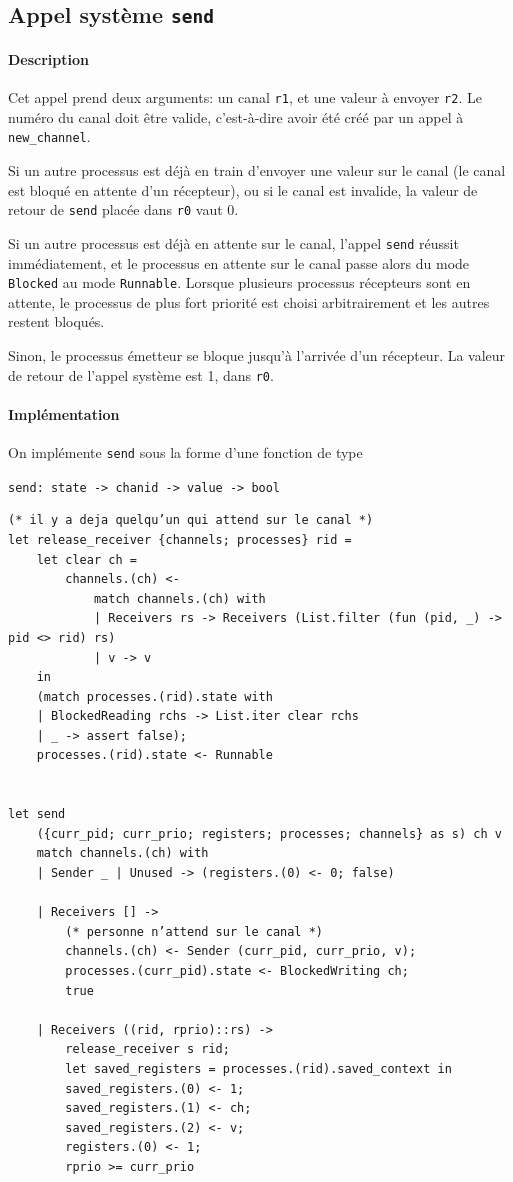\documentclass[french, toc]{../cs-classes/cs-classes}
\begin{document}
\subsection{Appel système \texttt{send}}
\paragraph*{Description} 
Cet appel prend deux arguments: un canal \texttt{r1}, et une valeur à envoyer \texttt{r2}. Le numéro du canal doit être valide, c'est-à-dire avoir été créé par un appel à \texttt{new\_channel}. 

Si un autre processus est déjà en train d'envoyer une valeur sur le canal (le canal est bloqué en attente d'un récepteur), ou si le canal est invalide, la valeur de retour de \texttt{send} placée dans \texttt{r0} vaut 0. 

Si un autre processus est déjà en attente sur le canal, l'appel \texttt{send} réussit immédiatement, et le processus en attente sur le canal passe alors du mode \texttt{Blocked} au mode \texttt{Runnable}. Lorsque plusieurs processus récepteurs sont en attente, le processus de plus fort priorité est choisi arbitrairement et les autres restent bloqués.

Sinon, le processus émetteur se bloque jusqu'à l'arrivée d'un récepteur. La valeur de retour de l'appel système est 1, dans \texttt{r0}.

\paragraph*{Implémentation} On implémente \texttt{send} sous la forme d'une fonction de type
\begin{center}
    \texttt{send: state -> chanid -> value -> bool}
\end{center}

\begin{verbatim}
(* il y a deja quelqu’un qui attend sur le canal *)
let release_receiver {channels; processes} rid =
    let clear ch =
        channels.(ch) <-
            match channels.(ch) with
            | Receivers rs -> Receivers (List.filter (fun (pid, _) -> pid <> rid) rs)
            | v -> v
    in
    (match processes.(rid).state with
    | BlockedReading rchs -> List.iter clear rchs
    | _ -> assert false);
    processes.(rid).state <- Runnable


let send
    ({curr_pid; curr_prio; registers; processes; channels} as s) ch v
    match channels.(ch) with
    | Sender _ | Unused -> (registers.(0) <- 0; false)

    | Receivers [] ->
        (* personne n’attend sur le canal *)
        channels.(ch) <- Sender (curr_pid, curr_prio, v);
        processes.(curr_pid).state <- BlockedWriting ch;
        true

    | Receivers ((rid, rprio)::rs) ->
        release_receiver s rid;
        let saved_registers = processes.(rid).saved_context in
        saved_registers.(0) <- 1;
        saved_registers.(1) <- ch;
        saved_registers.(2) <- v;
        registers.(0) <- 1;
        rprio >= curr_prio
\end{verbatim}
\end{document}
